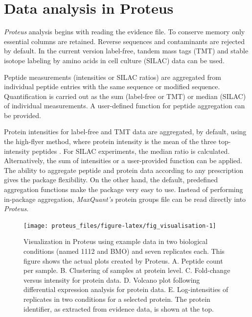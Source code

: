 \documentclass[]{article}
\begin{document}
\section{Data analysis in Proteus}\label{data-analysis-in-proteus}

\emph{Proteus} analysis begins with reading the evidence file. To
conserve memory only essential columns are retained. Reverse sequences
and contaminants are rejected by default. In the current version
label-free, tandem mass tags (TMT) \citep{thompson2003} and stable
isotope labeling by amino acids in cell culture (SILAC) \citep{ong2002}
data can be used.

Peptide measurements (intensities or SILAC ratios) are aggregated from
individual peptide entries with the same sequence or modified sequence.
Quantification is carried out as the sum (label-free or TMT) or median
(SILAC) of individual measurements. A user-defined function for peptide
aggregation can be provided.

Protein intensities for label-free and TMT data are aggregated, by
default, using the high-flyer method, where protein intensity is the
mean of the three top-intensity peptides \citep{silva2006}. For SILAC
experiments, the median ratio is calculated. Alternatively, the sum of
intensities or a user-provided function can be applied. The ability to
aggregate peptide and protein data according to any prescription gives
the package flexibility. On the other hand, the default, predefined
aggregation functions make the package very easy to use. Instead of
performing in-package aggregation, \emph{MaxQuant's} protein groups file
can be read directly into \emph{Proteus}.

\begin{figure}[H]

{\centering \texttt{[image: proteus\_files/figure-latex/fig\_visualisation-1]} 

}

\caption{\label{fig:visualisation}Visualization in Proteus using example data in two biological conditions (named 1112 and BMO) and seven replicates each. This figure shows the actual plots created by Proteus. A. Peptide count per sample. B. Clustering of samples at protein level. C. Fold-change versus intensity for protein data. D. Volcano plot following differential expression analysis for protein data. E. Log-intensities of replicates in two conditions for a selected protein. The protein identifier, as extracted from evidence data, is shown at the top.}\label{fig:fig_visualisation}
\end{figure}
\end{document}
